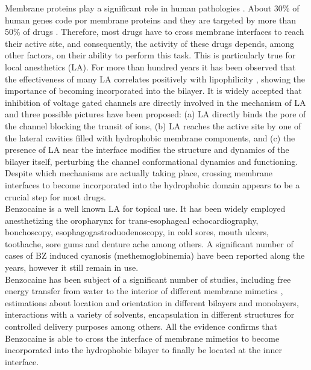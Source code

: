 \documentclass[9pt]{article}
\begin{document}
Membrane proteins play a significant role in human pathologies . About 30\% of human genes code por membrane proteins  and
they are targeted by more than 50\% of drugs . Therefore, most
drugs have to cross membrane interfaces to reach their active site, and
consequently, the activity of these drugs depends, among other factors, on their
ability to perform this task. This is particularly true for local anesthetics
(LA). For more than hundred years it has been observed that the effectiveness of
many LA correlates positively with lipophilicity , showing the
importance of becoming incorporated into the bilayer. It is widely accepted that
inhibition of voltage gated  channels are directly involved in the
mechanism of LA and three possible pictures have been
proposed: (a) LA directly binds the pore of the channel blocking the transit of
ions, (b) LA reaches the active site by one of the lateral cavities filled with
hydrophobic membrane components, and (c) the presence of LA near the interface
modifies the structure and dynamics of the bilayer itself, perturbing the
channel conformational dynamics and functioning. Despite
which mechanisms are actually taking place, crossing membrane interfaces to
become incorporated into the hydrophobic domain appears to be a crucial step for
most drugs.\\

Benzocaine is a well known LA for topical use. It has been widely employed
anesthetizing the oropharynx for trans-esophageal echocardiography, bonchoscopy,
esophagogastroduodenoscopy, in cold sores, mouth ulcers, toothache, sore gums
and denture ache among others. A significant number of cases of BZ
induced cyanosis (methemoglobinemia) have been reported along the
years, however it still remain in use.\\

Benzocaine has been subject of a significant number of studies, including free energy
transfer from water to the interior of different membrane mimetics , estimations about location and orientation in different bilayers and
monolayers, interactions with a variety of solvents, encapsulation in different structures for controlled delivery
purposes among others. All the evidence confirms that Benzocaine is
able to cross the interface of membrane mimetics to become incorporated into the
hydrophobic bilayer to finally be located at the inner interface.\\
\end{document}
